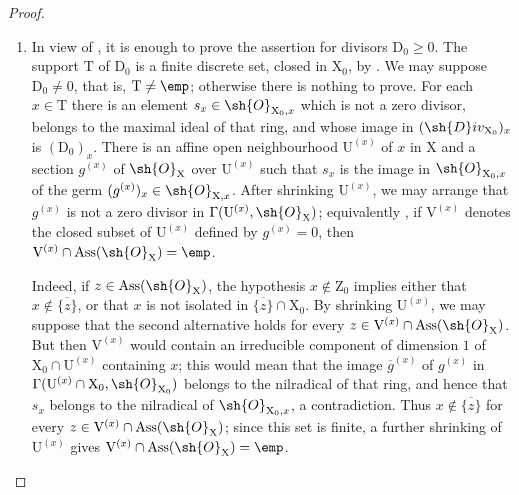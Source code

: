 \begin{proof}
\begin{enumerate}[label=(\roman*)]
  \item In view of , it is enough to prove the assertion for divisors $\mathrm{D}_0\geq0$.
The support $\mathrm{T}$ of $\mathrm{D}_0$ is a finite discrete set, closed in $\mathrm{X}_0$, by .
We may suppose $\mathrm{D}_0\neq0$, that is, $\mathrm{T}\neq\emp$; otherwise there is nothing to prove.
For each $x\in\mathrm{T}$ there is an element $s_x\in\sh{O}_{\mathrm{X}_0,x}$ which is not a zero divisor, belongs to the maximal ideal of that ring, and whose image in $(\sh{D}iv_{\mathrm{X}_0})_x$ is $(\mathrm{D}_0)_x$.
There is an affine open neighbourhood $\mathrm{U}^{(x)}$ of $x$ in $\mathrm{X}$ and a section $g^{(x)}$ of $\sh{O}_\mathrm{X}$ over $\mathrm{U}^{(x)}$ such that $s_x$ is the image in $\sh{O}_{\mathrm{X}_0,x}$ of the germ $(g^{(x)})_x\in\sh{O}_{\mathrm{X},x}$.
After shrinking $\mathrm{U}^{(x)}$, we may arrange that $g^{(x)}$ is not a zero divisor in $\Gamma(\mathrm{U}^{(x)},\sh{O}_\mathrm{X})$; equivalently , if $\mathrm{V}^{(x)}$ denotes the closed subset of $\mathrm{U}^{(x)}$ defined by $g^{(x)}=0$, then $\mathrm{V}^{(x)}\cap\operatorname{Ass}(\sh{O}_\mathrm{X})=\emp$.

Indeed, if $z\in\operatorname{Ass}(\sh{O}_\mathrm{X})$, the hypothesis $x\notin\mathrm{Z}_0$ implies either that $x\notin\overline{\{z\}}$, or that $x$ is not isolated in $\overline{\{z\}}\cap\mathrm{X}_0$.
By shrinking $\mathrm{U}^{(x)}$, we may suppose that the second alternative holds for every $z\in\mathrm{V}^{(x)}\cap\operatorname{Ass}(\sh{O}_\mathrm{X})$.
But then $\mathrm{V}^{(x)}$ would contain an irreducible component of dimension $1$ of $\mathrm{X}_0\cap\mathrm{U}^{(x)}$ containing $x$; this would mean that the image $\overline{g}^{(x)}$ of $g^{(x)}$ in $\Gamma(\mathrm{U}^{(x)}\cap\mathrm{X}_0,\sh{O}_{\mathrm{X}_0})$ belongs to the nilradical of that ring, and hence that $s_x$ belongs to the nilradical of $\sh{O}_{\mathrm{X}_0,x}$, a contradiction.
Thus $x\notin\overline{\{z\}}$ for every $z\in\mathrm{V}^{(x)}\cap\operatorname{Ass}(\sh{O}_\mathrm{X})$; since this set is finite, a further shrinking of $\mathrm{U}^{(x)}$ gives $\mathrm{V}^{(x)}\cap\operatorname{Ass}(\sh{O}_\mathrm{X})=\emp$.


\end{enumerate}
\end{proof}
